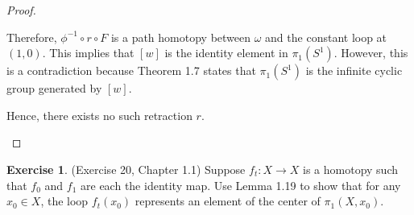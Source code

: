 \documentclass[12pt, psamsfonts]{amsart}
\theoremstyle{definition}
\newtheorem{exer}[thm]{Exercise}
\theoremstyle{remark}
\numberwithin{equation}{section}
\begin{document}
\begin{proof}
\begin{itemize}
      Therefore, $\phi^{-1} \circ r \circ F$ is a path homotopy between $\omega$ and the constant loop at $(1, 0)$.
      This implies that $[w]$ is the identity element in $\pi_1(S^1)$.
      However, this is a contradiction because Theorem 1.7 states that $\pi_1(S^1)$ is the infinite cyclic group generated by $[w]$.

      Hence, there exists no such retraction $r$.
  \end{itemize}
\end{proof}

\begin{exer}{(Exercise 20, Chapter 1.1)}
  Suppose $f_t: X \rightarrow X$ is a homotopy such that $f_0$ and $f_1$ are each the identity map.
  Use Lemma 1.19 to show that for any $x_0 \in X$, the loop $f_t(x_0)$ represents an element of the center of $\pi_1(X, x_0)$.
\end{exer}
\end{document}
